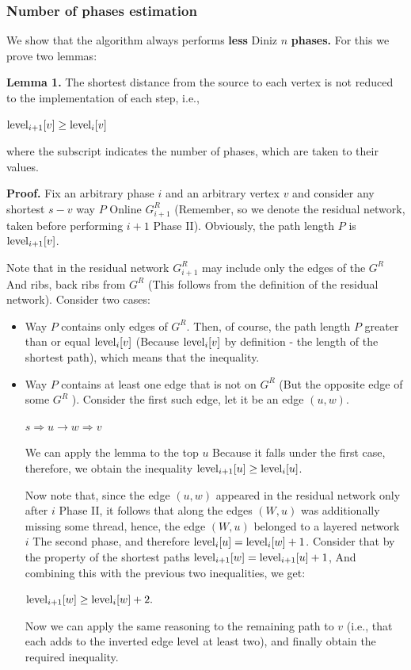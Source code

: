\subsubsection{ Number of phases estimation }

We show that the algorithm always performs \textbf{less} Diniz \textbf{$n$} \textbf{phases.} For this we prove two lemmas:

\textbf{Lemma 1.} The shortest distance from the source to each vertex is not reduced to the implementation of each step, i.e.,

${\rm level} _ {i +1} [v] \ge {\rm level} _i [v]$

where the subscript indicates the number of phases, which are taken to their values.

\textbf{Proof.} Fix an arbitrary phase $i$ and an arbitrary vertex $v$ and consider any shortest $s-v$ way $P$ Online $G ^ R_ {i +1}$ (Remember, so we denote the residual network, taken before performing $i +1$ Phase II). Obviously, the path length $P$ is ${\rm level} _ {i +1} [v]$.

Note that in the residual network $G ^ R_ {i +1}$ may include only the edges of the $G ^ R$ And ribs, back ribs from $G ^ R$ (This follows from the definition of the residual network). Consider two cases:

\begin{itemize} \item Way $P$ contains only edges of $G ^ R$. Then, of course, the path length $P$ greater than or equal ${\rm level} _i [v]$ (Because ${\rm level} _i [v]$ by definition - the length of the shortest path), which means that the inequality. \item Way $P$ contains at least one edge that is not on $G ^ R$ (But the opposite edge of some $G ^ R$ ). Consider the first such edge, let it be an edge $(u, w)$.

$s\Longrightarrow u\rightarrow w\Longrightarrow v$

We can apply the lemma to the top $u$ Because it falls under the first case, therefore, we obtain the inequality ${\rm level} _ {i +1} [u] \ge {\rm level} _i [u]$.

Now note that, since the edge $(u, w)$ appeared in the residual network only after $i$ Phase II, it follows that along the edges $(W, u)$ was additionally missing some thread, hence, the edge $(W, u)$ belonged to a layered network $i$ The second phase, and therefore ${\rm level} _i [u] = {\rm level} _i [w] + 1$. Consider that by the property of the shortest paths ${\rm level} _ {i +1} [w] = {\rm level} _ {i +1} [u] + 1$, And combining this with the previous two inequalities, we get:

${\rm level} _ {i +1} [w] \ge {\rm level} _i [w] + 2.$

Now we can apply the same reasoning to the remaining path to $v$ (i.e., that each adds to the inverted edge $\rm level$ at least two), and finally obtain the required inequality.

\end{itemize}

